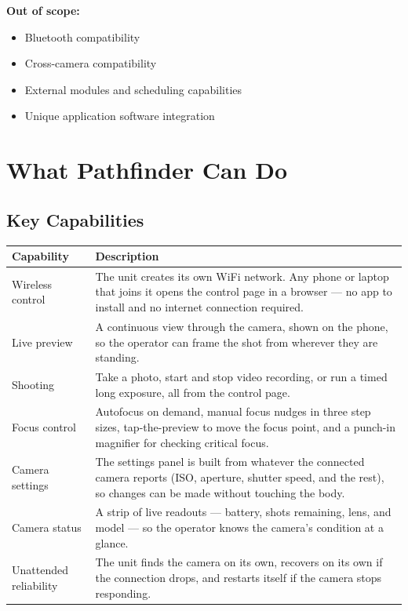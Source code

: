 \documentclass[11pt,a4paper]{article}
\begin{document}
\textbf{Out of scope:}
\begin{itemize}[leftmargin=1.5em]
    \item Bluetooth compatibility
    \item Cross-camera compatibility
    \item External modules and scheduling capabilities
    \item Unique application software integration
\end{itemize}

\section{What Pathfinder Can Do}

\subsection{Key Capabilities}
\begin{tabular}{p{} p{}}
    \toprule
    \textbf{Capability} & \textbf{Description} \\
    \midrule
    Wireless control & The unit creates its own WiFi network. Any phone or laptop that joins it opens the control page in a browser --- no app to install and no internet connection required. \\
    Live preview & A continuous view through the camera, shown on the phone, so the operator can frame the shot from wherever they are standing. \\
    Shooting & Take a photo, start and stop video recording, or run a timed long exposure, all from the control page. \\
    Focus control & Autofocus on demand, manual focus nudges in three step sizes, tap-the-preview to move the focus point, and a punch-in magnifier for checking critical focus. \\
    Camera settings & The settings panel is built from whatever the connected camera reports (ISO, aperture, shutter speed, and the rest), so changes can be made without touching the body. \\
    Camera status & A strip of live readouts --- battery, shots remaining, lens, and model --- so the operator knows the camera's condition at a glance. \\
    Unattended reliability & The unit finds the camera on its own, recovers on its own if the connection drops, and restarts itself if the camera stops responding. \\
    \bottomrule
\end{tabular}
\end{document}

